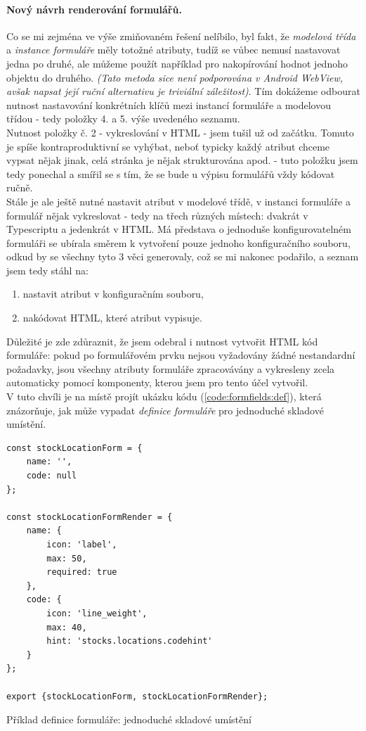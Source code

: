 \paragraph{Nový návrh renderování formulářů.} Co se mi zejména ve výše zmiňovaném řešení nelíbilo, byl fakt, že \emph{modelová třída} a \emph{instance formuláře} měly totožné atributy, tudíž se vůbec nemusí nastavovat jedna po druhé, ale můžeme použít například  \cite{mdn-object-assign} pro nakopírování hodnot jednoho objektu do druhého. \emph{(Tato metoda sice není podporována v Android WebView, avšak napsat její ruční alternativu je triviální záležitost)}. Tím dokážeme odbourat nutnost nastavování konkrétních klíčů mezi instancí formuláře a modelovou třídou - tedy položky 4. a 5. výše uvedeného seznamu.\\
Nutnost položky č. 2 - vykreslování v HTML - jsem tušil už od začátku. Tomuto je spíše kontraproduktivní se vyhýbat, neboť typicky každý atribut chceme vypsat nějak jinak, celá stránka je nějak strukturována apod. - tuto položku jsem tedy ponechal a smířil se s tím, že se bude u výpisu formulářů vždy kódovat ručně.\\
Stále je ale ještě nutné nastavit atribut v modelové třídě, v instanci formuláře a formulář nějak vykreslovat - tedy na třech různých místech: dvakrát v Typescriptu a jedenkrát v HTML. Má představa o jednoduše konfigurovatelném formuláři se ubírala směrem k vytvoření pouze jednoho konfiguračního souboru, odkud by se všechny tyto 3 věci generovaly, což se mi nakonec podařilo, a seznam jsem tedy stáhl na:

\begin{enumerate}
    \item nastavit atribut v konfiguračním souboru,
    \item nakódovat HTML, které atribut vypisuje.
\end{enumerate}

Důležité je zde zdůraznit, že jsem odebral i nutnost vytvořit HTML kód formuláře: pokud po formulářovém prvku nejsou vyžadovány žádné nestandardní požadavky, jsou všechny atributy formuláře zpracovávány a vykresleny zcela automaticky pomocí komponenty, kterou jsem pro tento účel vytvořil.\\
V tuto chvíli je na místě projít ukázku kódu (\ref{code:formfields:def}), která znázorňuje, jak může vypadat \emph{definice formuláře} pro jednoduché skladové umístění.

\begin{listing}[h]
\begin{verbatim}
const stockLocationForm = {
    name: '',
    code: null
};

const stockLocationFormRender = {
    name: {
        icon: 'label',
        max: 50,
        required: true
    },
    code: {
        icon: 'line_weight',
        max: 40,
        hint: 'stocks.locations.codehint'
    }
};

export {stockLocationForm, stockLocationFormRender};
\end{verbatim}
\caption{Příklad definice formuláře: jednoduché skladové umístění} \label{code:formfields:def}
\end{listing}

